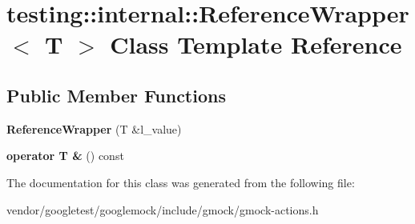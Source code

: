 \hypertarget{classtesting_1_1internal_1_1_reference_wrapper}{}\section{testing\+:\+:internal\+:\+:Reference\+Wrapper$<$ T $>$ Class Template Reference}
\label{classtesting_1_1internal_1_1_reference_wrapper}
\subsection*{Public Member Functions}
\begin{DoxyCompactItemize}
\item 
\mbox{\label{classtesting_1_1internal_1_1_reference_wrapper_ad33597ffc478c3af9190d1a288a76d39}} 
{\bfseries Reference\+Wrapper} (T \&l\+\_\+value)
\item 
\mbox{\label{classtesting_1_1internal_1_1_reference_wrapper_a187d6e6ffb4031444fff10dee7dc7de8}} 
{\bfseries operator T \&} () const
\end{DoxyCompactItemize}


The documentation for this class was generated from the following file\+:\begin{DoxyCompactItemize}
\item 
vendor/googletest/googlemock/include/gmock/gmock-\/actions.\+h\end{DoxyCompactItemize}
